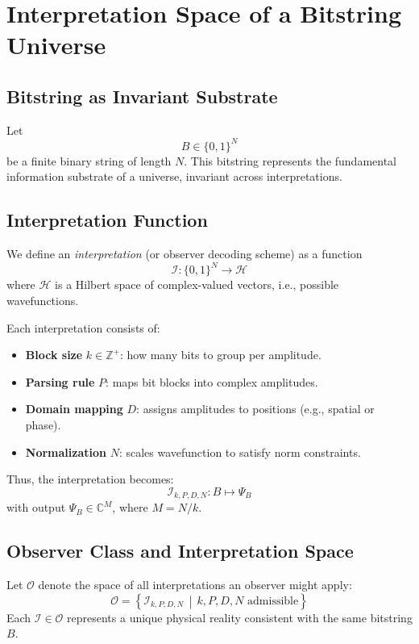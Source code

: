 \section{Interpretation Space of a Bitstring Universe}

\subsection{Bitstring as Invariant Substrate}

Let
\[
B \in \{0,1\}^N
\]
be a finite binary string of length \( N \). This bitstring represents the fundamental information substrate of a universe, invariant across interpretations.

\subsection{Interpretation Function}

We define an \emph{interpretation} (or observer decoding scheme) as a function
\[
\mathcal{I}: \{0,1\}^N \rightarrow \mathcal{H}
\]
where \( \mathcal{H} \) is a Hilbert space of complex-valued vectors, i.e., possible wavefunctions.

Each interpretation consists of:
\begin{itemize}
  \item \textbf{Block size} \( k \in \mathbb{Z}^+ \): how many bits to group per amplitude.
  \item \textbf{Parsing rule} \( P \): maps bit blocks into complex amplitudes.
  \item \textbf{Domain mapping} \( D \): assigns amplitudes to positions (e.g., spatial or phase).
  \item \textbf{Normalization} \( N \): scales wavefunction to satisfy norm constraints.
\end{itemize}

Thus, the interpretation becomes:
\[
\mathcal{I}_{k,P,D,N}: B \mapsto \Psi_B
\]
with output \( \Psi_B \in \mathbb{C}^M \), where \( M = N / k \).

\subsection{Observer Class and Interpretation Space}

Let \( \mathcal{O} \) denote the space of all interpretations an observer might apply:
\[
\mathcal{O} = \left\{ \mathcal{I}_{k,P,D,N} \,\middle|\, k, P, D, N \text{ admissible} \right\}
\]
Each \( \mathcal{I} \in \mathcal{O} \) represents a unique physical reality consistent with the same bitstring \( B \).


